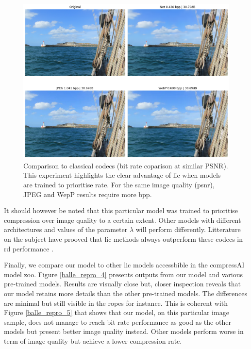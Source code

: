 \begin{figure}
    \centering
    \includegraphics[width=15cm]{../img/balle_repro_psnr.png}
    \caption[Comparison to classical codecs (bit rate coparison at similar PSNR).]{Comparison to classical codecs (bit rate coparison at similar PSNR). This experiment highlights the clear advantage of \acrshort{lic} when models are trained to prioritise rate. For the same image quality (\acrshort{psnr}), JPEG and WepP results require more \acrshort{bpp}.}
    \label{balle_repro_3}
\end{figure}

It should however be noted that this particular model was trained to prioritise compression over image quality to a certain extent. Other models with different architectures and values of the parameter \(\lambda\) will perform differently. Litterature on the subject have prooved that \acrshort{lic} methods always outperform these codecs in \acrshort{rd} performance \cite{ballé2018variationalimagecompressionscale}.

Finally, we compare our model to other \acrshort{lic} models accessbible in the compressAI model zoo. Figure \ref{balle_repro_4} presents outputs from our model and various pre-trained models. Results are visually close but, closer inspection reveals that our model retains more details than the other pre-trained models. The differences are minimal but still visible in the ropes for instance. This is coherent with Figure \ref{balle_repro_5} that shows that our model, on this particular image sample, does not manage to reach bit rate performance as good as the other models but present better image quality instead. Other models perform worse in term of image quality but achieve a lower compression rate.

